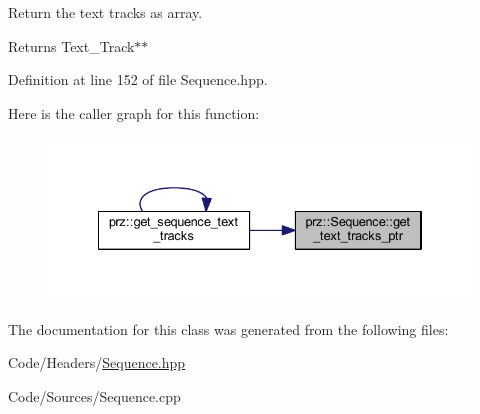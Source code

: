 Return the text tracks as array. 

\begin{DoxyReturn}{Returns}
Text\+\_\+\+Track$\ast$$\ast$ 
\end{DoxyReturn}


Definition at line 152 of file Sequence.\+hpp.

Here is the caller graph for this function\+:
\nopagebreak
\begin{figure}[H]
\begin{center}
\leavevmode
\includegraphics[width=334pt]{classprz_1_1_sequence_af987ebf568d1a5ab5d589f9a0e7746c9_icgraph}
\end{center}
\end{figure}


The documentation for this class was generated from the following files\+:\begin{DoxyCompactItemize}
\item 
Code/\+Headers/\mbox{\hyperlink{_sequence_8hpp}{Sequence.\+hpp}}\item 
Code/\+Sources/Sequence.\+cpp\end{DoxyCompactItemize}
